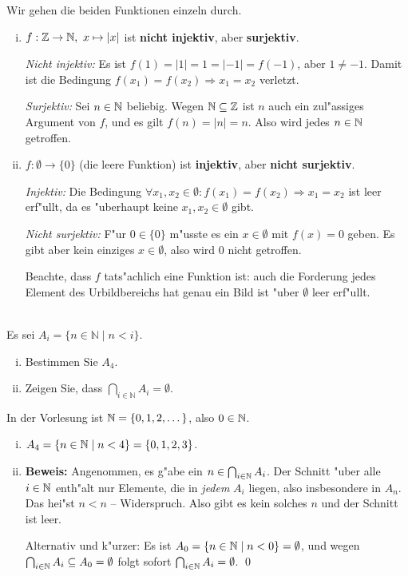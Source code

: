 \begin{loesung}
Wir gehen die beiden Funktionen einzeln durch.
\begin{enumerate}[(i)]
\item $f:\mathbb{Z}\to\mathbb{N},\ x\mapsto|x|$ ist \textbf{nicht injektiv}, aber \textbf{surjektiv}.

\emph{Nicht injektiv:} Es ist $f(1)=|1|=1=|-1|=f(-1)$, aber $1\neq -1$. Damit ist die Bedingung $f(x_1)=f(x_2)\Rightarrow x_1=x_2$ verletzt.

\emph{Surjektiv:} Sei $n\in\mathbb{N}$ beliebig. Wegen $\mathbb{N}\subseteq\mathbb{Z}$ ist $n$ auch ein zul"assiges Argument von $f$, und es gilt $f(n)=|n|=n$. Also wird jedes $n\in\mathbb{N}$ getroffen.

\item $f:\emptyset\to\{0\}$ (die \glqq leere Funktion\grqq) ist \textbf{injektiv}, aber \textbf{nicht surjektiv}.

\emph{Injektiv:} Die Bedingung $\forall x_1,x_2\in\emptyset: f(x_1)=f(x_2)\Rightarrow x_1=x_2$ ist leer erf"ullt, da es "uberhaupt keine $x_1,x_2\in\emptyset$ gibt.

\emph{Nicht surjektiv:} F"ur $0\in\{0\}$ m"usste es ein $x\in\emptyset$ mit $f(x)=0$ geben. Es gibt aber kein einziges $x\in\emptyset$, also wird $0$ nicht getroffen.

Beachte, dass $f$ tats"achlich eine Funktion ist: auch die Forderung \glqq jedes Element des Urbildbereichs hat genau ein Bild\grqq{} ist "uber $\emptyset$ leer erf"ullt.
\end{enumerate}
\end{loesung}

\\
Es sei $A_i=\{n\in\mathbb{N}\mid n<i\}$.
\begin{enumerate}[(i)]
    \item Bestimmen Sie $A_4$.
    \item Zeigen Sie, dass $\bigcap_{i\in\mathbb{N}}A_i=\emptyset$.
\end{enumerate}

\begin{loesung}
In der Vorlesung ist $\mathbb{N}=\{0,1,2,\dots\}$, also $0\in\mathbb{N}$.
\begin{enumerate}[(i)]
\item $A_4=\{n\in\mathbb{N}\mid n<4\}=\{0,1,2,3\}$.
\item \textbf{Beweis:} Angenommen, es g"abe ein $n\in\bigcap_{i\in\mathbb{N}}A_i$. Der Schnitt "uber alle $i\in\mathbb{N}$ enth"alt nur Elemente, die in \emph{jedem} $A_i$ liegen, also insbesondere in $A_n$. Das hei"st $n<n$ -- Widerspruch. Also gibt es kein solches $n$ und der Schnitt ist leer.

Alternativ und k"urzer: Es ist $A_0=\{n\in\mathbb{N}\mid n<0\}=\emptyset$, und wegen $\bigcap_{i\in\mathbb{N}}A_i\subseteq A_0=\emptyset$ folgt sofort $\bigcap_{i\in\mathbb{N}}A_i=\emptyset$.
\qed
\end{enumerate}
\end{loesung}

